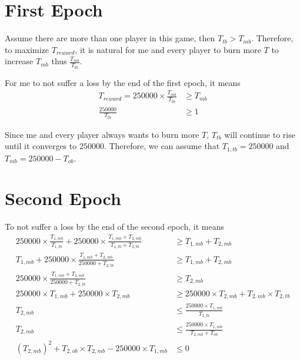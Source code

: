 \documentclass{article}
\begin{document}
\section*{First Epoch}
Assume there are more than one player in this game, then $T_{tb} > T_{mb}$. 
Therefore, to maximize $T_{reward}$, it is natural for me and every player to burn more $T$ to increase $T_{mb}$ thus $\frac{T_{mb}}{T_{tb}}$.

For me to not suffer a loss by the end of the first epoch, it means 
\begin{align}
    T_{reward} = \num{250000} \times \frac{T_{mb}}{T_{tb}} & \ge T_{mb} \\
    \frac{\num{250000}}{T_{tb}} & \ge 1
\end{align}

Since me and every player always wants to burn more $T$, $T_{tb}$ will continue to rise until it converges to $\num{250000}$.
Therefore, we can assume that $T_{1,tb} = \num{250000}$ and $T_{mb} = \num{250000} - T_{ob}$.

\section*{Second Epoch}
To not suffer a loss by the end of the second epoch, it means 
\begin{align}
    \num{250000} \times \frac{T_{1,mb}}{T_{1,tb}} + \num{250000} \times \frac{T_{1,mb} + T_{2,mb}}{T_{1,tb} + T_{2,tb}} & \ge T_{1,mb} + T_{2,mb} \\
    T_{1,mb} + \num{250000} \times \frac{T_{1,mb} + T_{2,mb}}{\num{250000} + T_{2,tb}} & \ge T_{1,mb} + T_{2,mb} \\
    \num{250000} \times \frac{T_{1,mb} + T_{2,mb}}{\num{250000} + T_{2,tb}} & \ge T_{2,mb} \\
    \num{250000} \times T_{1,mb} + \num{250000} \times T_{2,mb} & \ge \num{250000} \times T_{2,mb} + T_{2,mb} \times T_{2,tb} \\
    T_{2,mb} & \le \frac{\num{250000} \times T_{1,mb}}{T_{2,tb}} \\
    T_{2,mb} & \le \frac{\num{250000} \times T_{1,mb}}{T_{2,mb} + T_{ob}} \\
    (T_{2,mb})^2 + T_{2,ob} \times T_{2,mb} -\num{250000} \times T_{1,mb} & \le 0
\end{align}
\end{document}
